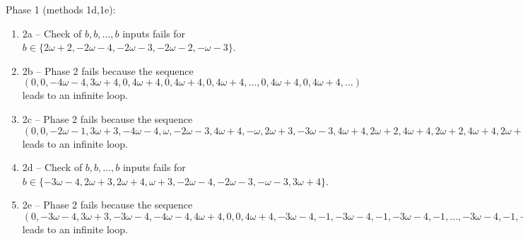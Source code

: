 \begin{exmp}
Phase 1 (methods 1d,\allowbreak  1e):
\begin{enumerate}[ ]
\item  2a -- Check of $b,\allowbreak b,\allowbreak \dots,\allowbreak b$ inputs fails for $b\in \{2\omega + 2,\allowbreak  -2\omega - 4,\allowbreak  -2\omega - 3,\allowbreak  -2\omega - 2,\allowbreak  -\omega - 3\}$.
\item  2b -- Phase 2   fails because  the sequence $(0,\allowbreak  0,\allowbreak  -4\omega - 4,\allowbreak  3\omega + 4,\allowbreak  0,\allowbreak  4\omega + 4,\allowbreak  0,\allowbreak  4\omega + 4,\allowbreak  0,\allowbreak  4\omega + 4,\allowbreak  \dots ,\allowbreak 0,\allowbreak  4\omega + 4,\allowbreak  0,\allowbreak  4\omega + 4,\allowbreak  \dots)$ leads to an infinite loop.
\item  2c -- Phase 2   fails because  the sequence $(0,\allowbreak  0,\allowbreak  -2\omega - 1,\allowbreak  3\omega + 3,\allowbreak  -4\omega - 4,\allowbreak  \omega,\allowbreak  -2\omega - 3,\allowbreak  4\omega + 4,\allowbreak  -\omega,\allowbreak  2\omega + 3,\allowbreak  -3\omega - 3,\allowbreak  4\omega + 4,\allowbreak  2\omega + 2,\allowbreak  4\omega + 4,\allowbreak  2\omega + 2,\allowbreak  4\omega + 4,\allowbreak  2\omega + 2,\allowbreak  \dots ,\allowbreak 4\omega + 4,\allowbreak  2\omega + 2,\allowbreak  4\omega + 4,\allowbreak  2\omega + 2,\allowbreak  \dots)$ leads to an infinite loop.
\item  2d -- Check of $b,\allowbreak b,\allowbreak \dots,\allowbreak b$ inputs fails for $b\in \{-3\omega - 4,\allowbreak  2\omega + 3,\allowbreak  2\omega + 4,\allowbreak  \omega + 3,\allowbreak  -2\omega - 4,\allowbreak  -2\omega - 3,\allowbreak  -\omega - 3,\allowbreak  3\omega + 4\}$.
\item  2e -- Phase 2   fails because  the sequence $(0,\allowbreak  -3\omega - 4,\allowbreak  3\omega + 3,\allowbreak  -3\omega - 4,\allowbreak  -4\omega - 4,\allowbreak  4\omega + 4,\allowbreak  0,\allowbreak  0,\allowbreak  4\omega + 4,\allowbreak  -3\omega - 4,\allowbreak  -1,\allowbreak  -3\omega - 4,\allowbreak  -1,\allowbreak  -3\omega - 4,\allowbreak  -1,\allowbreak  \dots ,\allowbreak -3\omega - 4,\allowbreak  -1,\allowbreak  -3\omega - 4,\allowbreak  -1,\allowbreak  \dots)$ leads to an infinite loop.
\end{enumerate}



\end{exmp}
